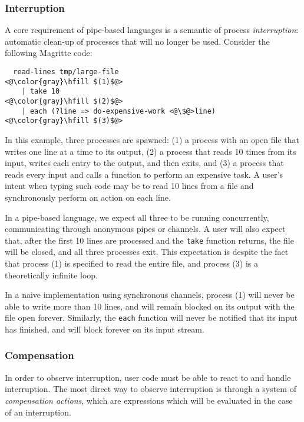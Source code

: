 \documentclass[english,PRO]{ipsj}
\begin{document}
\subsubsection{Interruption}\noindent
A core requirement of pipe-based languages is a semantic of process \emph{interruption}: automatic clean-up of processes that will no longer be used. Consider the following Magritte code:
\begin{lstlisting}
  read-lines tmp/large-file                        <@\color{gray}\hfill $(1)$@>
    | take 10                                      <@\color{gray}\hfill $(2)$@>
    | each (?line => do-expensive-work <@\$@>line) <@\color{gray}\hfill $(3)$@>
\end{lstlisting}

\noindent
In this example, three processes are spawned: (1) a process with an open file that writes one line at a time to its output, (2) a process that reads 10 times from its input, writes each entry to the output, and then exits, and (3) a process that reads every input and calls a function to perform an expensive task.
A user's intent when typing such code may be to read 10 lines from a file and synchronously perform an action on each line.

In a pipe-based language, we expect all three to be running concurrently, communicating through anonymous pipes or channels.
A user will also expect that, after the first 10 lines are processed and the \verb/take/ function returns, the file will be closed, and all three processes exit.
This expectation is despite the fact that process (1) is specified to read the entire file, and process (3) is a theoretically infinite loop.

In a naive implementation using synchronous channels, process (1) will never be able to write more than 10 lines, and will remain blocked on its output with the file open forever.
Similarly, the \verb/each/ function will never be notified that its input has finished, and will block forever on its input stream.

\subsubsection{Compensation}\noindent
In order to observe interruption, user code must be able to react to and handle interruption. The most direct way to observe interruption is through a system of \emph{compensation actions}, which are expressions which will be evaluated in the case of an interruption.
\end{document}
